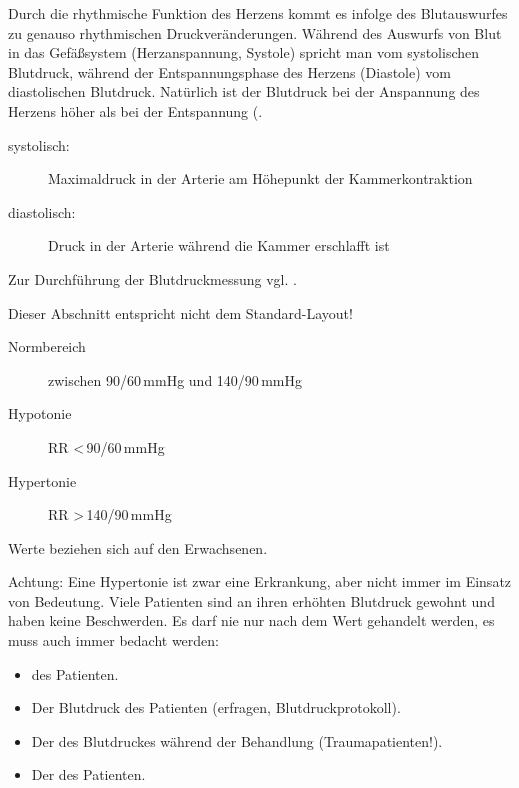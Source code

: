 {
Durch die rhythmische Funktion des
Herzens kommt es infolge des Blutauswurfes zu genauso rhythmischen Druckveränderungen.
Während des Auswurfs von Blut in das
Gefäßsystem (Herzanspannung, Systole)
spricht man vom systolischen Blutdruck, während
der Entspannungsphase des Herzens (Diastole) vom
diastolischen Blutdruck. Natürlich ist der Blutdruck bei
der Anspannung des Herzens höher als bei der Entspannung
(.
}{
\begin{description}
    \item[systolisch:] Maximaldruck in der Arterie am Höhepunkt der
Kammerkontraktion
    \item[diastolisch:] Druck in der Arterie während die Kammer erschlafft ist
\end{description}
}{}{}{}


Zur Durchführung der Blutdruckmessung vgl.
.



   {Dieser Abschnitt entspricht nicht dem Standard-Layout!
}
\begin{description}
    \item[Normbereich] zwischen 90/60\,mmHg und
    140/90\,mmHg 
    \item[Hypotonie] RR {\textless}\,90/60\,mmHg
    \item[Hypertonie] RR {\textgreater}\,140/90\,mmHg
\end{description}

{\tiny Werte beziehen sich auf den Erwachsenen.}

Achtung: Eine Hypertonie ist zwar eine Erkrankung, aber nicht immer im
Einsatz von Bedeutung. Viele Patienten sind an ihren erhöhten
Blutdruck gewohnt und haben keine Beschwerden. Es darf nie nur nach dem
Wert gehandelt werden, es muss auch immer bedacht werden: 

\begin{itemize}
    \item {} des Patienten.
    \item Der  Blutdruck des Patienten
    (erfragen, Blutdruckprotokoll).
    \item Der  des Blutdruckes während der
    Behandlung (Traumapatienten!).
    \item Der  des Patienten.
\end{itemize}

